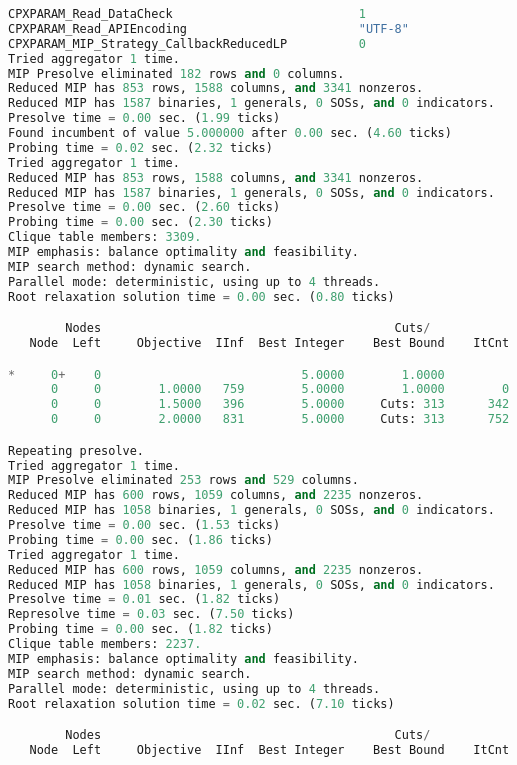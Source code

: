 \begin{lstlisting}[language=Python]
CPXPARAM_Read_DataCheck                          1
CPXPARAM_Read_APIEncoding                        "UTF-8"
CPXPARAM_MIP_Strategy_CallbackReducedLP          0
Tried aggregator 1 time.
MIP Presolve eliminated 182 rows and 0 columns.
Reduced MIP has 853 rows, 1588 columns, and 3341 nonzeros.
Reduced MIP has 1587 binaries, 1 generals, 0 SOSs, and 0 indicators.
Presolve time = 0.00 sec. (1.99 ticks)
Found incumbent of value 5.000000 after 0.00 sec. (4.60 ticks)
Probing time = 0.02 sec. (2.32 ticks)
Tried aggregator 1 time.
Reduced MIP has 853 rows, 1588 columns, and 3341 nonzeros.
Reduced MIP has 1587 binaries, 1 generals, 0 SOSs, and 0 indicators.
Presolve time = 0.00 sec. (2.60 ticks)
Probing time = 0.00 sec. (2.30 ticks)
Clique table members: 3309.
MIP emphasis: balance optimality and feasibility.
MIP search method: dynamic search.
Parallel mode: deterministic, using up to 4 threads.
Root relaxation solution time = 0.00 sec. (0.80 ticks)

        Nodes                                         Cuts/
   Node  Left     Objective  IInf  Best Integer    Best Bound    ItCnt     Gap

*     0+    0                            5.0000        1.0000            80.00%
      0     0        1.0000   759        5.0000        1.0000        0   80.00%
      0     0        1.5000   396        5.0000     Cuts: 313      342   70.00%
      0     0        2.0000   831        5.0000     Cuts: 313      752   60.00%

Repeating presolve.
Tried aggregator 1 time.
MIP Presolve eliminated 253 rows and 529 columns.
Reduced MIP has 600 rows, 1059 columns, and 2235 nonzeros.
Reduced MIP has 1058 binaries, 1 generals, 0 SOSs, and 0 indicators.
Presolve time = 0.00 sec. (1.53 ticks)
Probing time = 0.00 sec. (1.86 ticks)
Tried aggregator 1 time.
Reduced MIP has 600 rows, 1059 columns, and 2235 nonzeros.
Reduced MIP has 1058 binaries, 1 generals, 0 SOSs, and 0 indicators.
Presolve time = 0.01 sec. (1.82 ticks)
Represolve time = 0.03 sec. (7.50 ticks)
Probing time = 0.00 sec. (1.82 ticks)
Clique table members: 2237.
MIP emphasis: balance optimality and feasibility.
MIP search method: dynamic search.
Parallel mode: deterministic, using up to 4 threads.
Root relaxation solution time = 0.02 sec. (7.10 ticks)

        Nodes                                         Cuts/
   Node  Left     Objective  IInf  Best Integer    Best Bound    ItCnt     Gap


\end{lstlisting}
